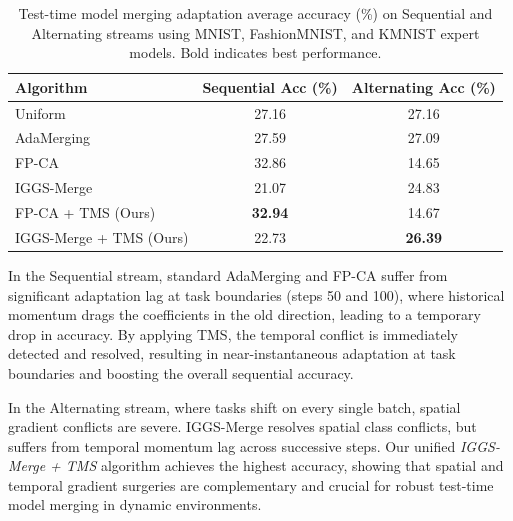 \documentclass{article}
\theoremstyle{plain}
\theoremstyle{definition}
\theoremstyle{remark}
\begin{document}
\begin{table}[t]
\caption{Test-time model merging adaptation average accuracy (\%) on Sequential and Alternating streams using MNIST, FashionMNIST, and KMNIST expert models. Bold indicates best performance.}
\label{tab:main_results}
\vskip 0.15in
\begin{center}
\begin{small}
\begin{sc}
\begin{tabular}{lcc}
\toprule
Algorithm & Sequential Acc (\%) & Alternating Acc (\%) \\
\midrule
Uniform & 27.16 & 27.16 \\
AdaMerging & 27.59 & 27.09 \\
FP-CA & 32.86 & 14.65 \\
IGGS-Merge & 21.07 & 24.83 \\
\midrule
FP-CA + TMS (Ours) & \textbf{32.94} & 14.67 \\
IGGS-Merge + TMS (Ours) & 22.73 & \textbf{26.39} \\
\bottomrule
\end{tabular}
\end{sc}
\end{small}
\end{center}
\vskip -0.1in
\end{table}

In the Sequential stream, standard AdaMerging and FP-CA suffer from significant adaptation lag at task boundaries (steps 50 and 100), where historical momentum drags the coefficients in the old direction, leading to a temporary drop in accuracy. By applying TMS, the temporal conflict is immediately detected and resolved, resulting in near-instantaneous adaptation at task boundaries and boosting the overall sequential accuracy.

In the Alternating stream, where tasks shift on every single batch, spatial gradient conflicts are severe. IGGS-Merge resolves spatial class conflicts, but suffers from temporal momentum lag across successive steps. Our unified \emph{IGGS-Merge + TMS} algorithm achieves the highest accuracy, showing that spatial and temporal gradient surgeries are complementary and crucial for robust test-time model merging in dynamic environments.
\end{document}
